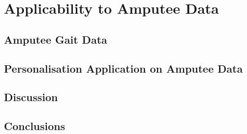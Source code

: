 \chapter{Applicability to Amputee Data}
\label{chp:amputee-data}




\section{Amputee Gait Data}



\section{Personalisation Application on Amputee Data}


\section{Discussion}


\section{Conclusions}